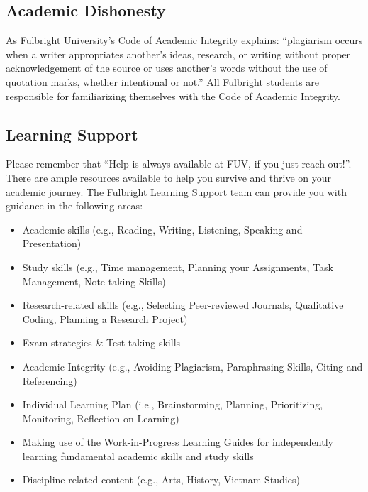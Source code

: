 \documentclass[
]{article}
\providecommand{\tightlist}{%
  \setlength{\itemsep}{0pt}\setlength{\parskip}{0pt}}
\begin{document}
\subsection*{Academic Dishonesty}\label{academic-dishonesty}

As Fulbright University's Code of Academic Integrity explains: ``plagiarism occurs when a writer appropriates another's ideas, research, or writing without proper acknowledgement of the source or uses another's words without the use of quotation marks, whether intentional or not.'' All Fulbright students are responsible for familiarizing themselves with the Code of Academic Integrity.

\subsection*{Learning Support}\label{learning-support}

Please remember that ``Help is always available at FUV, if you just reach out!''. There are ample resources available to help you survive and thrive on your academic journey. The Fulbright Learning Support team can provide you with guidance in the following areas:

\begin{itemize}
\tightlist
\item
  Academic skills (e.g., Reading, Writing, Listening, Speaking and Presentation)
\item
  Study skills (e.g., Time management, Planning your Assignments, Task Management, Note-taking Skills)\\
\item
  Research-related skills (e.g., Selecting Peer-reviewed Journals, Qualitative Coding, Planning a Research Project)
\item
  Exam strategies \& Test-taking skills\\
\item
  Academic Integrity (e.g., Avoiding Plagiarism, Paraphrasing Skills, Citing and Referencing)
\item
  Individual Learning Plan (i.e., Brainstorming, Planning, Prioritizing, Monitoring, Reflection on Learning)
\item
  Making use of the Work-in-Progress Learning Guides for independently learning fundamental academic skills and study skills
\item
  Discipline-related content (e.g., Arts, History, Vietnam Studies)
\end{itemize}
\end{document}

